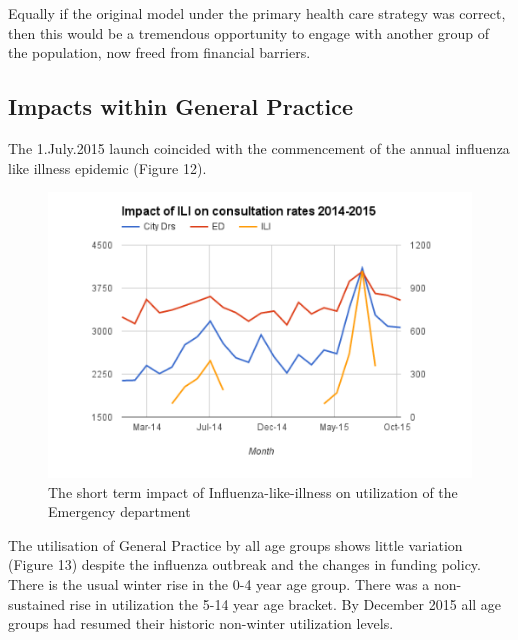 \documentclass[11pt,a4paper]{article}
\begin{document}
Equally if the original model under the primary health care strategy was correct, then this would be a tremendous opportunity to engage with another group of the population, now freed from financial barriers.\\ 

\subsection{Impacts within General Practice}
The 1.July.2015 launch coincided with the commencement of the annual influenza like illness epidemic (Figure 12). \\

\begin{figure}[htp]
\centering
\includegraphics[scale=0.50]{ILI.png}
\caption{The short term impact of Influenza-like-illness on utilization of the Emergency department}
\label{Impact of Influenza-like-illness}
\end{figure}

The utilisation of General Practice by all age groups shows little variation (Figure 13) despite the influenza outbreak and the changes in funding policy. There is the usual winter rise in the 0-4 year age group. There was a non-sustained rise in utilization the 5-14 year age bracket. By December 2015 all age groups had resumed their historic non-winter utilization levels. \\
\end{document}

